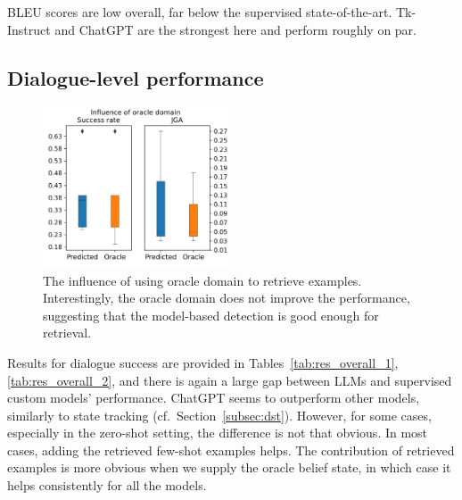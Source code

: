 BLEU scores are low overall, far below the supervised state-of-the-art. Tk-Instruct and ChatGPT are the strongest here and perform roughly on par.

\subsection{Dialogue-level performance}
\label{07:sec:dialogue-performance}
\begin{figure}[t]
    \centering
    \includegraphics[width=0.49\textwidth]{images/oracle_domains.png}
    \caption{The influence of using oracle domain to retrieve examples. Interestingly, the oracle domain does not improve the performance, suggesting that the model-based detection is good enough for retrieval.}
    \label{07:fig:oracle_domains}
\end{figure}
Results for dialogue success are provided in Tables~\ref{tab:res_overall_1},\ref{tab:res_overall_2}, and there is again a large gap between LLMs and supervised custom models' performance.
ChatGPT seems to outperform other models, similarly to state tracking (cf.~Section~\ref{subsec:dst}).
However, for some cases, especially in the zero-shot setting, the difference is not that obvious.
In most cases, adding the retrieved few-shot examples helps.
The contribution of retrieved examples is more obvious when we supply the oracle belief state, in which case it helps consistently for all the models.

